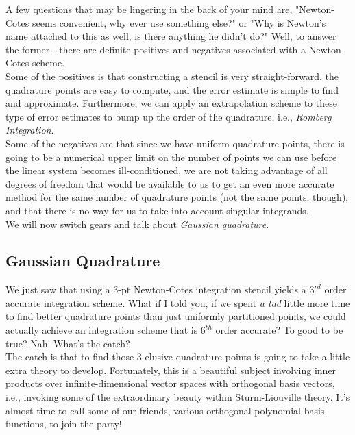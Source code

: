 \documentclass[paper=a4, fontsize=11pt]{scrartcl} %
\numberwithin{equation}{section} %
\numberwithin{figure}{section} %
\numberwithin{table}{section} %
\begin{document}
A few questions that may be lingering in the back of your mind are, "Newton-Cotes seems convenient, why ever use something else?" or "Why is Newton's name attached to this as well, is there anything he didn't do?" Well, to answer the former - there are definite positives and negatives associated with a Newton-Cotes scheme. \\

Some of the positives is that constructing a stencil is very straight-forward, the quadrature points are easy to compute, and the error estimate is simple to find and approximate. Furthermore, we can apply an extrapolation scheme to these type of error estimates to bump up the order of the quadrature, i.e., \emph{Romberg Integration}.\\

Some of the negatives are that since we have uniform quadrature points, there is going to be a numerical upper limit on the number of points we can use before the linear system becomes ill-conditioned, we are not taking advantage of all degrees of freedom that would be available to us to get an even more accurate method for the same number of quadrature points (not the same points, though), and that there is no way for us to take into account singular integrands.\\

We will now switch gears and talk about \emph{Gaussian quadrature}. \\



%
%
%
%
%
%

\subsection{Gaussian Quadrature}

$ $\\

We just saw that using a $3$-pt Newton-Cotes integration stencil yields a $3^{rd}$ order accurate integration scheme. What if I told you, if we spent \emph{a tad} little more time to find better quadrature points than just uniformly partitioned points, we could actually achieve an integration scheme that is $6^{th}$ order accurate? To good to be true? Nah. What's the catch?\\

The catch is that to find those $3$ elusive quadrature points is going to take a little extra theory to develop. Fortunately, this is a beautiful subject involving inner products over infinite-dimensional vector spaces with orthogonal basis vectors, i.e., invoking some of the extraordinary beauty within Sturm-Liouville theory. It's almost time to call some of our friends, various orthogonal polynomial basis functions, to join the party!
\end{document}
